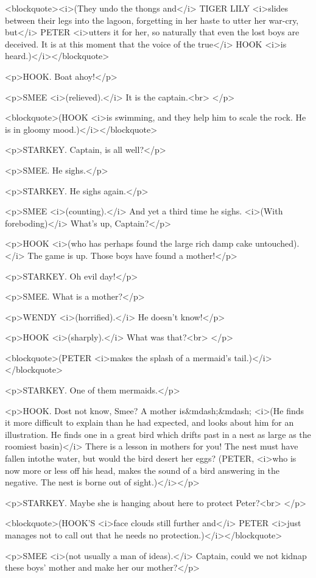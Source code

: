 <blockquote><i>(They undo the thongs and</i> TIGER LILY <i>slides
between their legs into the lagoon, forgetting in her haste to utter
her war-cry, but</i> PETER <i>utters it for her, so naturally that
even the lost boys are deceived. It is at this moment that the voice
of the true</i> HOOK <i>is heard.)</i></blockquote>

<p>HOOK. Boat ahoy!</p>

<p>SMEE <i>(relieved).</i> It is the captain.<br>
</p>

<blockquote>(HOOK <i>is swimming, and they help him to scale the
rock. He is in gloomy mood.)</i></blockquote>

<p>STARKEY. Captain, is all well?</p>

<p>SMEE. He sighs.</p>

<p>STARKEY. He sighs again.</p>

<p>SMEE <i>(counting).</i> And yet a third time he sighs. <i>(With
foreboding)</i> What's up, Captain?</p>

<p>HOOK <i>(who has perhaps found the large rich damp cake
untouched).</i> The game is up. Those boys have found a mother!</p>

<p>STARKEY. Oh evil day!</p>

<p>SMEE. What is a mother?</p>

<p>WENDY <i>(horrified).</i> He doesn't know!</p>

<p>HOOK <i>(sharply).</i> What was that?<br>
</p>

<blockquote>(PETER <i>makes the splash of a mermaid's
tail.)</i></blockquote>

<p>STARKEY. One of them mermaids.</p>

<p>HOOK. Dost not know, Smee? A mother is&mdash;&mdash; <i>(He finds
it more difficult to explain than he had expected, and looks about
him for an illustration. He finds one in a great bird which drifts
past in a nest as large as the roomiest basin)</i> There is a lesson
in mothers for you! The nest must have fallen intothe water, but
would the bird desert her eggs? (PETER, <i>who is now more or less
off his head, makes the sound of a bird answering in the negative.
The nest is borne out of sight.)</i></p>

<p>STARKEY. Maybe she is hanging about here to protect Peter?<br>
</p>

<blockquote>(HOOK'S <i>face clouds still further and</i> PETER
<i>just manages not to call out that he needs no
protection.)</i></blockquote>

<p>SMEE <i>(not usually a man of ideas).</i> Captain, could we not
kidnap these boys' mother and make her our mother?</p>

